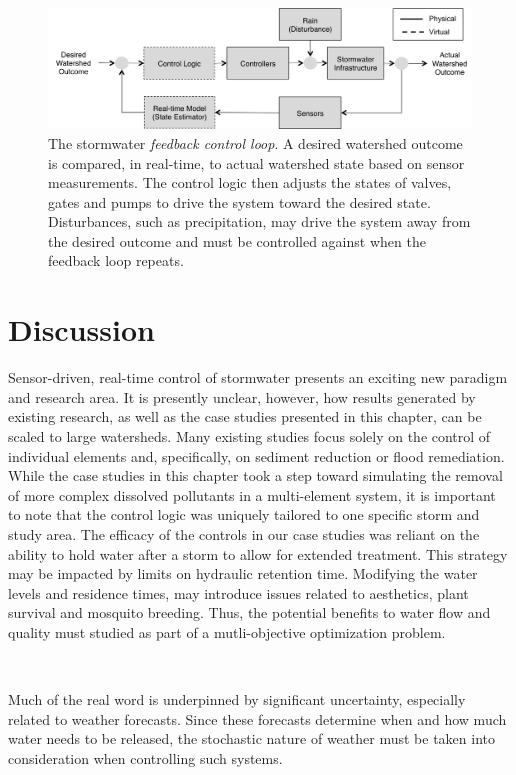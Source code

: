 \begin{figure}
\centering
\includegraphics[width=.9\textwidth]{gfx/Chapter-1/arch.png}
  \caption{The stormwater \textit{feedback control loop}. A desired watershed outcome is compared, in real-time, to actual watershed state based on sensor measurements. The control logic then adjusts the states of valves, gates and pumps to drive the system toward the desired state. Disturbances, such as precipitation, may drive the system away from the desired outcome and must be controlled against when the feedback loop repeats.}\label{fig-ch1:rsch_gaps}
\end{figure}

\section{Discussion}
Sensor-driven, real-time control of stormwater presents an exciting new paradigm and research area. It is presently unclear, however, how results generated by existing research, as well as the case studies presented in this chapter, can be scaled to large watersheds. 
Many existing studies focus solely on the control of individual elements and, specifically, on sediment reduction or flood remediation. 
While the case studies in this chapter took a step toward simulating the removal of more complex dissolved pollutants in a multi-element system, it is important to note that the control logic was uniquely  tailored to one specific storm and study area. 
The efficacy of the controls in our case studies was reliant on the ability to hold water after a storm to allow for extended treatment. 
This strategy may be impacted by limits on hydraulic retention time.
Modifying the water levels and residence times, may introduce issues related to aesthetics, plant survival and mosquito breeding\cite{Knight2003211}. Thus, the potential benefits to water flow and quality must studied as part of a mutli-objective optimization problem.

\

Much of the real word is underpinned by significant uncertainty, especially related to weather forecasts. 
Since these forecasts determine when and how much water needs to be released, the stochastic nature of weather must be taken into consideration when controlling such systems. 

